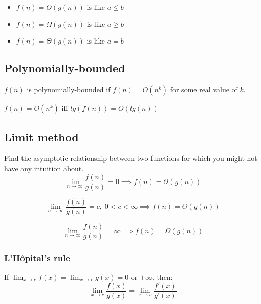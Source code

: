     \begin{intuition}
        
        \begin{itemize}
            \item $f(n) = O(g(n)) \text{ is like } a \leq b$
            \item $f(n) = \Omega(g(n)) \text{ is like } a \geq b$
            \item $f(n) = \Theta(g(n)) \text{ is like } a = b$
        \end{itemize}
    \end{intuition}

\subsection{Polynomially-bounded}
    \begin{definition}
        $f(n)$ is polynomially-bounded if $f(n)=O\left(n^k\right)$ for some real value of $k$.
    \end{definition}

    \begin{theorem}
        $f(n)=O\left(n^k\right)$ iff $lg(f(n))=O(lg(n))$
    \end{theorem}

\subsection{Limit method}
    \begin{definition}
        Find the asymptotic relationship between two functions for which you might not have any intuition about. 
        \begin{equation}
            \lim_{n \to \infty} \frac{f(n)}{g(n)} = 0 \implies f(n) = \mathcal{O}(g(n))
        \end{equation}
        
        \begin{equation}
            \lim_{n \to \infty} \frac{f(n)}{g(n)} = c, \; 0 < c < \infty \implies f(n) = \Theta(g(n))
        \end{equation}
        
        \begin{equation}
            \lim_{n \to \infty} \frac{f(n)}{g(n)} = \infty \implies f(n) = \Omega(g(n))
        \end{equation}
    \end{definition}

    \subsubsection{L'Hôpital's rule}
    \begin{definition}
        If $\lim_{x \to c} f(x) = \lim_{x \to c} g(x) = 0$ or $\pm \infty$, then:
        \begin{equation}
            \lim_{x \to c} \frac{f(x)}{g(x)} = \lim_{x \to c} \frac{f'(x)}{g'(x)}
        \end{equation}
        
    \end{definition}

